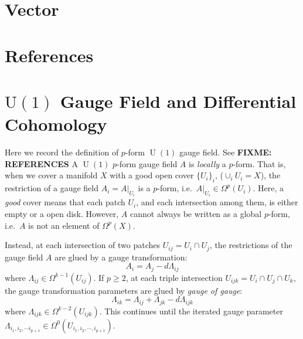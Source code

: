 \documentclass[
  letterpaper,
  DIV=11,
  numbers=noendperiod]{scrreport}
\DeclareMathOperator{\U}{U}
\begin{document}

\chapter{Vector}\label{sec-vector}


\chapter*{References}\label{references}


\printbibliography[heading=none]

\cleardoublepage
{}
{}
\appendix

\chapter{\texorpdfstring{\(\mathrm{U}(1)\) Gauge Field and Differential
Cohomology}{\textbackslash mathrm\{U\}(1) Gauge Field and Differential Cohomology}}\label{sec-app-gauge-field}

Here we record the definition of \(p\)-form \(\U(1)\) gauge field. See
\textbf{FIXME: REFERENCES} A \(\U(1)\) \(p\)-form gauge field \(A\) is
\emph{locally} a \(p\)-form. That is, when we cover a manifold \(X\)
with a good open cover \(\{U_i\}_i\), (\(\cup_i U_i = X\)), the
restriction of a gauge field \(A_i = A|_{U_i}\) is a \(p\)-form,
i.e.~\(A|_{U_i} \in \Omega^p(U_i)\). Here, a \emph{good} cover means
that each patch \(U_i\), and each intersection among them, is either
empty or a open disk. However, \(A\) cannot always be written as a
global \(p\)-form, i.e.~\(A\) is not an element of \(\Omega^{p}(X)\).

Instead, at each intersection of two patches \(U_{ij} = U_i \cap U_j\),
the restrictions of the gauge field \(A\) are glued by a gauge
transformation: \[
A_{i} = A_{j} - d\Lambda_{ij}
\] where \(\Lambda_{ij} \in \Omega^{k-1}(U_{ij})\). If \(p\ge 2\), at
each triple intersection \(U_{ijk} = U_i \cap U_j \cap U_k\), the gauge
transformation parameters are glued by \emph{gauge of gauge}: \[
\Lambda_{ik} = \Lambda_{ij} + \Lambda_{jk} - d\Lambda_{ijk}
\] where \(\Lambda_{ijk}\in \Omega^{k-2}(U_{ijk})\). This continues
until the iterated gauge parameter
\(\Lambda_{i_1,i_2,\cdots i_{p+1}} \in \Omega^0(U_{i_1,i_2,\cdots,i_{p+1}})\).
\end{document}
